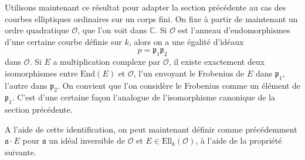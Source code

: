 \documentclass[11pt,a4paper]{article}
\newcommand{\C}{\mathbb{C}}
\renewcommand{\O}{\mathcal{O}}
\newcommand{\vers}{\longrightarrow}
\newcommand{\End}{\mathrm{End}}
\newcommand{\Ell}{\mathrm{Ell}}
\renewcommand{\frak}{\mathfrak}
\newcommand{\de}{\,:\,}
\renewcommand{\v}{\vspace{5mm}}
\newtheorem*{prop}{Proposition}
\theoremstyle{definition}
\begin{document}
Utilisons maintenant ce résultat pour adapter la section précédente au cas des courbes elliptiques ordinaires sur un corps fini. On fixe à partir de maintenant un ordre quadratique $\O$, que l'on voit dans $\C$. Si $\O$ est l'anneau d'endomorphismes d'une certaine courbe définie sur $k$, alors on a une égalité d'idéaux
$$p = \frak{p}_1 \frak{p}_2$$
dans $\O$. Si $E$ a multiplication complexe par $\O$, il existe exactement deux isomorphismes entre $\End(E)$ et $\O$, l'un envoyant le Frobenius de $E$ dans $\frak p_1$, l'autre dans $\frak p_2$. On convient que l'on considère le Frobenius comme un élément de $\frak p_1$. C'est d'une certaine façon l'analogue de l'isomorphisme canonique de la section précédente.%

%
%
%
%
%
%
%
%
%
A l'aide de cette identification, on peut maintenant définir comme précédemment $\frak a\cdot E$ pour $\frak a$ un idéal inversible de $\O$ et $E\in \Ell_k(\O)$, à l'aide de la propriété suivante.
\end{document}

